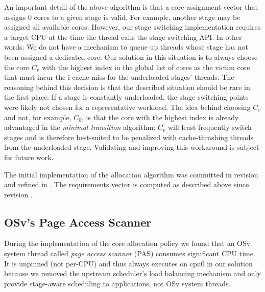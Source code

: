 \documentclass[12pt,a4paper]{book}
\begin{document}
An important detail of the above algorithm is that a core assignment vector that assigns 0 cores to a given stage is valid.
For example, another stage may be assigned all available cores.
However, our stage switching implementation requires a target CPU at the time the thread calls the stage switching API.
In other words: We do not  have a mechanism to queue up threads whose stage has not been assigned a dedicated core.
Our solution in this situation is to always choose the core $C_v$ with the highest index in the global list of cores as the victim core that must incur the i-cache miss for the underloaded stages' threads.
The reasoning behind this decision is that the described situation should be rare in the first place:
If a stage is constantly underloaded, the stage-switching points were likely not chosen for a representative workload.
The idea behind choosing $C_v$ and not, for example, $C_0$, is that the core with the highest index is already advantaged in the \emph{minimal transition} algorithm:
$C_v$ will least frequently switch stages and is therefore best-suited to be penalized with cache-thrashing threads from the underloaded stage.
Validating and improving this workaround is subject for future work.

The initial implementation of the allocation algorithm was committed in revision  and refined in .
The requirements vector is computed as described above since revision .

\subsection{OSv's Page Access Scanner}
During the implementation of the core allocation policy we found that an OSv system thread called \emph{page access scanner} (PAS) consumes significant CPU time.
It is unpinned (not per-CPU) and thus always executes on cpu0 in our solution because we removed the upstream scheduler's load balancing mechanism and only provide stage-aware scheduling to applications, not OSv system threads.
\end{document}
